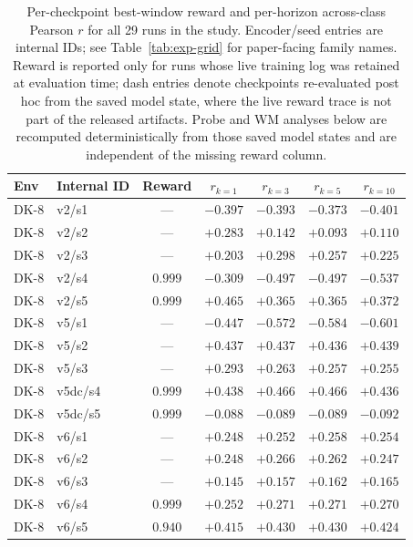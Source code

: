\documentclass{article}
\begin{document}
\begin{table}[h]
  \centering
  \caption{Per-checkpoint best-window reward and per-horizon across-class Pearson $r$ for all 29 runs in the study. Encoder/seed entries are internal IDs; see Table~\ref{tab:exp-grid} for paper-facing family names. Reward is reported only for runs whose live training log was retained at evaluation time; dash entries denote checkpoints re-evaluated post hoc from the saved model state, where the live reward trace is not part of the released artifacts. Probe and WM analyses below are recomputed deterministically from those saved model states and are independent of the missing reward column.}
  \label{tab:per-checkpoint}
  \footnotesize
  \begin{tabular}{l l c c c c c}
    \toprule
    Env & Internal ID & Reward & $r_{k=1}$ & $r_{k=3}$ & $r_{k=5}$ & $r_{k=10}$ \\
    \midrule
    DK-8  & v2/s1   &  ---   & $-0.397$ & $-0.393$ & $-0.373$ & $-0.401$ \\
    DK-8  & v2/s2   &  ---   & $+0.283$ & $+0.142$ & $+0.093$ & $+0.110$ \\
    DK-8  & v2/s3   &  ---   & $+0.203$ & $+0.298$ & $+0.257$ & $+0.225$ \\
    DK-8  & v2/s4   & $0.999$ & $-0.309$ & $-0.497$ & $-0.497$ & $-0.537$ \\
    DK-8  & v2/s5   & $0.999$ & $+0.465$ & $+0.365$ & $+0.365$ & $+0.372$ \\
    DK-8  & v5/s1   &  ---   & $-0.447$ & $-0.572$ & $-0.584$ & $-0.601$ \\
    DK-8  & v5/s2   &  ---   & $+0.437$ & $+0.437$ & $+0.436$ & $+0.439$ \\
    DK-8  & v5/s3   &  ---   & $+0.293$ & $+0.263$ & $+0.257$ & $+0.255$ \\
    DK-8  & v5dc/s4 & $0.999$ & $+0.438$ & $+0.466$ & $+0.466$ & $+0.436$ \\
    DK-8  & v5dc/s5 & $0.999$ & $-0.088$ & $-0.089$ & $-0.089$ & $-0.092$ \\
    DK-8  & v6/s1   &  ---   & $+0.248$ & $+0.252$ & $+0.258$ & $+0.254$ \\
    DK-8  & v6/s2   &  ---   & $+0.248$ & $+0.266$ & $+0.262$ & $+0.247$ \\
    DK-8  & v6/s3   &  ---   & $+0.145$ & $+0.157$ & $+0.162$ & $+0.165$ \\
    DK-8  & v6/s4   & $0.999$ & $+0.252$ & $+0.271$ & $+0.271$ & $+0.270$ \\
    DK-8  & v6/s5   & $0.940$ & $+0.415$ & $+0.430$ & $+0.430$ & $+0.424$ \\

\end{tabular}
\end{table}
\end{document}
